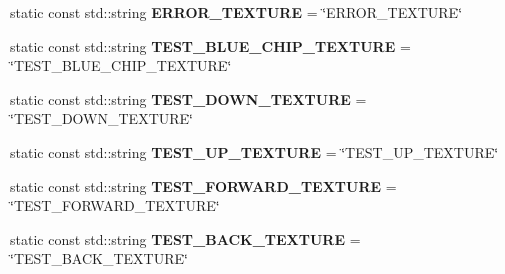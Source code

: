 \begin{DoxyCompactItemize}
\item 
\mbox{\label{struct_geometry_engine_1_1_geometry_material_1_1_texture_constant_adbb6f4c427b3b3af5812f0398d7ba300}} 
static const std\+::string {\bfseries E\+R\+R\+O\+R\+\_\+\+T\+E\+X\+T\+U\+RE} = \char`\"{}E\+R\+R\+O\+R\+\_\+\+T\+E\+X\+T\+U\+RE\char`\"{}
\item 
\mbox{\label{struct_geometry_engine_1_1_geometry_material_1_1_texture_constant_a1e0aecce1d7191e455247cef94e8f25c}} 
static const std\+::string {\bfseries T\+E\+S\+T\+\_\+\+B\+L\+U\+E\+\_\+\+C\+H\+I\+P\+\_\+\+T\+E\+X\+T\+U\+RE} = \char`\"{}T\+E\+S\+T\+\_\+\+B\+L\+U\+E\+\_\+\+C\+H\+I\+P\+\_\+\+T\+E\+X\+T\+U\+RE\char`\"{}
\item 
\mbox{\label{struct_geometry_engine_1_1_geometry_material_1_1_texture_constant_a94584fb1db953e985fe8c6566b6b5e7b}} 
static const std\+::string {\bfseries T\+E\+S\+T\+\_\+\+D\+O\+W\+N\+\_\+\+T\+E\+X\+T\+U\+RE} = \char`\"{}T\+E\+S\+T\+\_\+\+D\+O\+W\+N\+\_\+\+T\+E\+X\+T\+U\+RE\char`\"{}
\item 
\mbox{\label{struct_geometry_engine_1_1_geometry_material_1_1_texture_constant_aa28071adee0f24f833a5a7208ec11661}} 
static const std\+::string {\bfseries T\+E\+S\+T\+\_\+\+U\+P\+\_\+\+T\+E\+X\+T\+U\+RE} = \char`\"{}T\+E\+S\+T\+\_\+\+U\+P\+\_\+\+T\+E\+X\+T\+U\+RE\char`\"{}
\item 
\mbox{\label{struct_geometry_engine_1_1_geometry_material_1_1_texture_constant_ae5d3a921c2ec438cfb2b03ae02b32372}} 
static const std\+::string {\bfseries T\+E\+S\+T\+\_\+\+F\+O\+R\+W\+A\+R\+D\+\_\+\+T\+E\+X\+T\+U\+RE} = \char`\"{}T\+E\+S\+T\+\_\+\+F\+O\+R\+W\+A\+R\+D\+\_\+\+T\+E\+X\+T\+U\+RE\char`\"{}
\item 
\mbox{\label{struct_geometry_engine_1_1_geometry_material_1_1_texture_constant_a418e57b947677ac4adc3d52a97941b58}} 
static const std\+::string {\bfseries T\+E\+S\+T\+\_\+\+B\+A\+C\+K\+\_\+\+T\+E\+X\+T\+U\+RE} = \char`\"{}T\+E\+S\+T\+\_\+\+B\+A\+C\+K\+\_\+\+T\+E\+X\+T\+U\+RE\char`\"{}

\end{DoxyCompactItemize}
